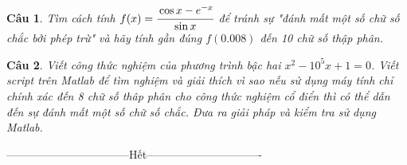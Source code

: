 \documentclass[11pt]{article}
\newtheorem{bt}{Câu}
\begin{document}
\begin{bt}
Tìm cách tính $f(x)=\cfrac{\cos x-e^{-x}}{\sin x}$ để tránh sự "đánh mất một số chữ số chắc bởi phép trừ" và hãy tính gần đúng $f(0.008)$ đến 10 chữ số thập phân.
\end{bt}

\begin{bt}
Viết công thức nghiệm của phương trình bậc hai $x^2-10^5x+1=0$. Viết script trên Matlab để tìm nghiệm và giải thích vì sao nếu sử dụng máy tính chỉ chính xác đến 8 chữ số thâp phân cho công thức nghiệm cổ điển thì có thể dẫn đến sự đánh mất một số chữ số chắc. Đưa ra giải pháp và kiểm tra sử dụng Matlab.
\end{bt}

\centerline{———————————Hết——————————-}

% 
   
\end{document}
